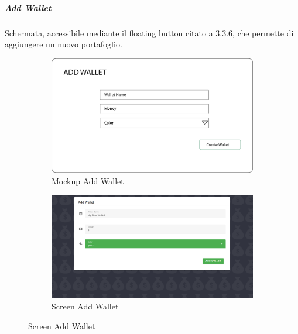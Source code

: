 \documentclass{report}
\begin{document}
\subparagraph{Add Wallet}
Schermata, accessibile mediante il floating button citato a 3.3.6, che permette di aggiungere un nuovo portafoglio.
\begin{figure}[H]
    \begin{subfigure}
        \centering
        \includegraphics[scale=0.3]{images/mockups/Add Wallet.png}
        \caption{Mockup Add Wallet}
    \end{subfigure}
    \par\bigskip
    \begin{subfigure}
        \centering
        \includegraphics[scale=0.35]{images/screens/Add Wallet.png}
        \caption{Screen Add Wallet}
    \end{subfigure}
\end{figure}
\end{document}
